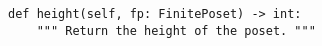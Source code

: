 \begin{verbatim}
def height(self, fp: FinitePoset) -> int:
    """ Return the height of the poset. """
\end{verbatim}